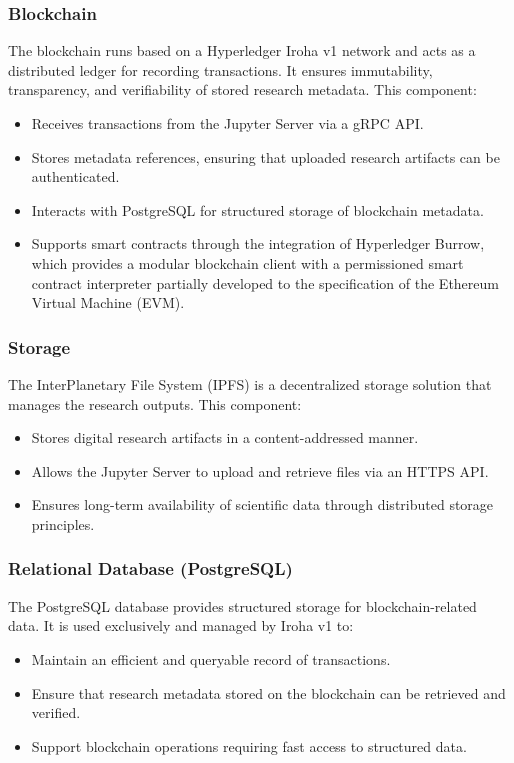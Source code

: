 \documentclass{article}
\begin{document}
\subsubsection{Blockchain}
The blockchain runs based on a Hyperledger Iroha v1 network and acts as a distributed ledger for recording transactions. It ensures immutability, transparency, and verifiability of stored research metadata. This component:
\begin{itemize}
      \item Receives transactions from the Jupyter Server via a gRPC API.
      \item Stores metadata references, ensuring that uploaded research artifacts can be authenticated.
      \item Interacts with PostgreSQL for structured storage of blockchain metadata.
      \item Supports smart contracts through the integration of Hyperledger Burrow, which provides a modular blockchain client with a permissioned smart contract interpreter partially developed to the specification of the Ethereum Virtual Machine (EVM).

\end{itemize}

\subsubsection{Storage}
The InterPlanetary File System (IPFS) is a decentralized storage solution that manages the research outputs. This component:
\begin{itemize}
      \item Stores digital research artifacts in a content-addressed manner.
      \item Allows the Jupyter Server to upload and retrieve files via an HTTPS API.
      \item Ensures long-term availability of scientific data through distributed storage principles.
\end{itemize}


\subsubsection{Relational Database (PostgreSQL)}
The PostgreSQL database provides structured storage for blockchain-related data. It is used exclusively and managed by Iroha v1 to:
\begin{itemize}
      \item Maintain an efficient and queryable record of transactions.
      \item Ensure that research metadata stored on the blockchain can be retrieved and verified.
      \item Support blockchain operations requiring fast access to structured data.
\end{itemize}
\end{document}
